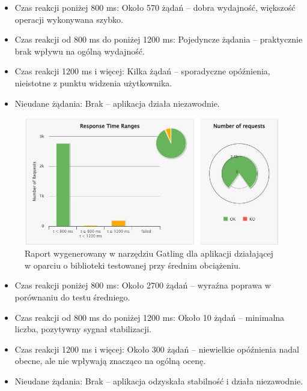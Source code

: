 \documentclass[runningheads,12pt]{llncs}
\begin{document}
\begin{itemize}
    \item Czas reakcji poniżej 800 ms: Około 570 żądań – dobra wydajność, większość operacji wykonywana szybko.
    \item Czas reakcji od 800 ms do poniżej 1200 ms: Pojedyncze żądania – praktycznie brak wpływu na ogólną wydajność.
    \item Czas reakcji 1200 ms i więcej: Kilka żądań – sporadyczne opóźnienia, nieistotne z punktu widzenia użytkownika.
    \item Nieudane żądania: Brak – aplikacja działa niezawodnie.
\end{itemize}

\newpage

\begin{figure}
    \centering
    \includegraphics[width=0.8\linewidth]{images/library-gatling-middle-graph.jpg}
    \caption{Raport wygenerowany w narzędziu Gatling dla aplikacji działającej w oparciu o biblioteki testowanej przy średnim obciążeniu.}
    \label{fig:middle}
\end{figure}

\begin{itemize}
    \item Czas reakcji poniżej 800 ms: Około 2700 żądań – wyraźna poprawa w porównaniu do testu średniego.
    \item Czas reakcji od 800 ms do poniżej 1200 ms: Około 10 żądań – minimalna liczba, pozytywny sygnał stabilizacji.
    \item Czas reakcji 1200 ms i więcej: Około 300 żądań – niewielkie opóźnienia nadal obecne, ale nie wpływają znacząco na ogólną ocenę.
    \item Nieudane żądania: Brak – aplikacja odzyskała stabilność i działa niezawodnie.
\end{itemize}

\newpage
\end{document}
